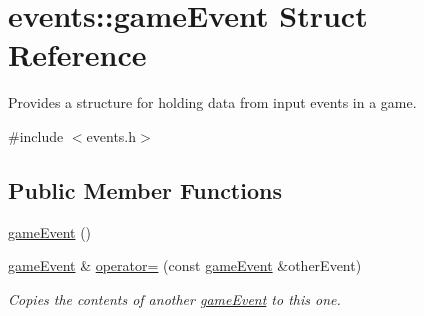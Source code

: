 \hypertarget{structevents_1_1game_event}{}\section{events\+:\+:game\+Event Struct Reference}
\label{structevents_1_1game_event}


Provides a structure for holding data from input events in a game.  




{\ttfamily \#include $<$events.\+h$>$}

\subsection*{Public Member Functions}
\begin{DoxyCompactItemize}
\item 
\hyperlink{structevents_1_1game_event_aeea6c5c2370516efd761a2a5729e1068}{game\+Event} ()
\item 
\hyperlink{structevents_1_1game_event}{game\+Event} \& \hyperlink{structevents_1_1game_event_afc1d4ef04d4e6efb6a609defab3bf20f}{operator=} (const \hyperlink{structevents_1_1game_event}{game\+Event} \&other\+Event)
\begin{DoxyCompactList}\small\item\em Copies the contents of another \hyperlink{structevents_1_1game_event}{game\+Event} to this one. \end{DoxyCompactList}\end{DoxyCompactItemize}
